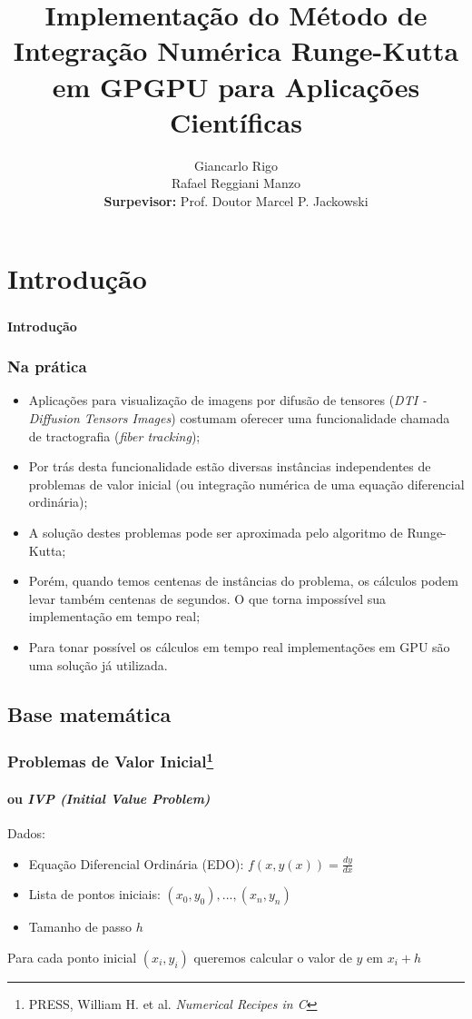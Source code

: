 \documentclass[brazil, 10pt]{beamer}
\title{Implementação do Método de Integração Numérica Runge-Kutta em GPGPU para Aplicações Científicas}
\author{Giancarlo Rigo\\
        Rafael Reggiani Manzo\\
        \textbf{Surpevisor:} Prof. Doutor Marcel P. Jackowski}
\begin{document}
\maketitle

\section{Introdução}
\begin{frame}
  \frametitle{}
  \framesubtitle{}
  \begin{Large}
  \begin{center}
  \textbf{Introdução}
  \end{center}
  \end{Large}
\end{frame}

\begin{frame}
  \frametitle{Na prática}
  
  \begin{itemize}
    \item Aplicações para visualização de imagens por difusão de tensores (\textit{DTI - Diffusion Tensors Images}) costumam oferecer uma funcionalidade chamada de tractografia (\textit{fiber tracking});
    \item Por trás desta funcionalidade estão diversas instâncias independentes de problemas de valor inicial (ou integração numérica de uma equação diferencial ordinária);
    \item A solução destes problemas pode ser aproximada pelo algoritmo de Runge-Kutta;
    \item Porém, quando temos centenas de instâncias do problema, os cálculos podem levar também centenas de segundos. O que torna impossível sua implementação em tempo real;
    \item Para tonar possível os cálculos em tempo real implementações em GPU são uma solução já utilizada. 
  \end{itemize}
  
\end{frame}

\subsection{Base matemática}
\begin{frame}
  \frametitle{Problemas de Valor Inicial\footnote{PRESS, William H. et al. \textit{Numerical Recipes in C}}}
  \framesubtitle{ou \textit{IVP (Initial Value Problem)}}

  Dados:
  \begin{itemize}
    \item Equação Diferencial Ordinária (EDO): $f(x, y(x)) = \frac{dy}{dx} $
    \item Lista de pontos iniciais: $ (x_{0}, y_{0}),...,(x_{n},y_{n}) $
    \item Tamanho de passo $ h $
  \end{itemize}
   
  Para cada ponto inicial $ (x_{i}, y_{i}) $ queremos calcular o valor de $ y $ em $ x_{i} + h $ 
\end{frame}
\end{document}

